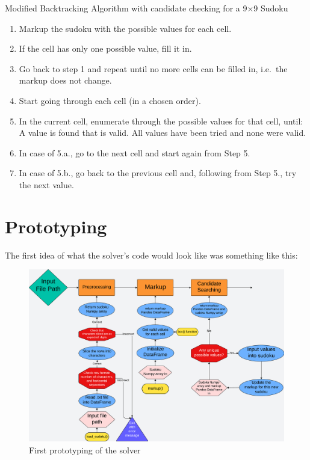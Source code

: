 \documentclass[12pt]{report} %
\begin{document}
\begin{definitionbox}{Modified Backtracking Algorithm with candidate checking for a 9$\times$9 Sudoku}

  \begin{enumerate}
    \item Markup the sudoku with the possible values for each cell.
    \item If the cell has only one possible value, fill it in.
    \item Go back to step 1 and repeat until no more cells can be filled in, i.e.\ the markup does not change.
    \item Start going through each cell (in a chosen order).
    \item In the current cell, enumerate through the possible values for that cell, until:
     A value is found that is valid.
     All values have been tried and none were valid.
    \item In case of 5.a., go to the next cell and start again from Step 5.
    \item In case of 5.b., go back to the previous cell and, following from Step 5., try the next value.
  \end{enumerate}

\end{definitionbox}

\newpage
\section{Prototyping}

The first idea of what the solver's code would look like was something like this:

\begin{figure}[bthp]
  \centering
  \includegraphics[width=\textwidth]{prototyping1.png}
  \caption{First prototyping of the solver}
\end{figure}
\end{document}
